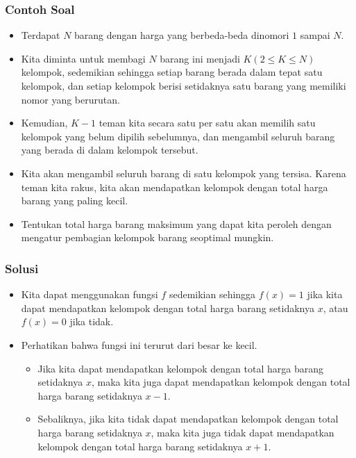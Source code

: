 \begin{frame}
\frametitle{Contoh Soal}
\begin{itemize}
  \item Terdapat $N$ barang dengan harga yang berbeda-beda dinomori $1$ sampai $N$.
  \item Kita diminta untuk membagi $N$ barang ini menjadi $K (2 \le K \le N)$ kelompok, sedemikian sehingga setiap barang berada dalam tepat satu kelompok, dan setiap kelompok berisi setidaknya satu barang yang memiliki nomor yang berurutan.
  \item Kemudian, $K - 1$ teman kita secara satu per satu akan memilih satu kelompok yang belum dipilih sebelumnya, dan mengambil seluruh barang yang berada di dalam kelompok tersebut.
  \item Kita akan mengambil seluruh barang di satu kelompok yang tersisa. Karena teman kita rakus, kita akan mendapatkan kelompok dengan total harga barang yang paling kecil.
  \item Tentukan total harga barang maksimum yang dapat kita peroleh dengan mengatur pembagian kelompok barang seoptimal mungkin.
\end{itemize}
\end{frame}

\begin{frame}
\frametitle{Solusi}
\begin{itemize}
  \item Kita dapat menggunakan fungsi $f$ sedemikian sehingga $f(x) = 1$ jika kita dapat mendapatkan kelompok dengan total harga barang setidaknya $x$, atau $f(x) = 0$ jika tidak.
  \item Perhatikan bahwa fungsi ini terurut dari besar ke kecil.
  \begin{itemize}
    \item Jika kita dapat mendapatkan kelompok dengan total harga barang setidaknya $x$, maka kita juga dapat mendapatkan kelompok dengan total harga barang setidaknya $x - 1$.
    \item Sebaliknya, jika kita tidak dapat mendapatkan kelompok dengan total harga barang setidaknya $x$, maka kita juga tidak dapat mendapatkan kelompok dengan total harga barang setidaknya $x + 1$.
  \end{itemize}
\end{itemize}
\end{frame}

